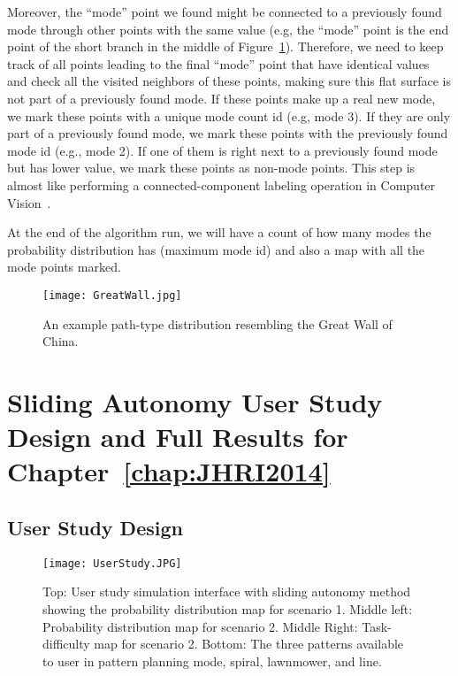 \begin{enumerate}
Moreover, the ``mode'' point we found might be connected to a previously found mode through other points with the same value (e.g, the ``mode'' point is the end point of the short branch in the middle of Figure~\ref{GreatWall}). Therefore, we need to keep track of all points leading to the final ``mode'' point that have identical values and check all the visited neighbors of these points, making sure this flat surface is not part of a previously found mode. If these points make up a real new mode, we mark these points with a unique mode count id (e.g, mode 3). If they are only part of a previously found mode, we mark these points with the previously found mode id (e.g., mode 2). If one of them is right next to a previously found mode but has lower value, we mark these points as non-mode points. This step is almost like performing a connected-component labeling operation in Computer Vision~\cite{Sonka2007Image}.
\end{enumerate}

At the end of the algorithm run, we will have a count of how many modes the probability distribution has (maximum mode id) and also a map with all the mode points marked.

\begin{figure}
\centering
\texttt{[image: GreatWall.jpg]}
\caption{An example path-type distribution resembling the Great Wall of China.}
\label{GreatWall}
\end{figure}




\chapter{Sliding Autonomy User Study Design and Full Results for Chapter~\ref{chap:JHRI2014}}
\label{chap:SlidingAutonomy}

\section{User Study Design} 
\label{sec:ADesign}

\begin{figure}
\centering
\texttt{[image: UserStudy.JPG]}
\caption{Top: User study simulation interface with sliding autonomy method showing the probability distribution map for scenario 1. Middle left: Probability distribution map for scenario 2. Middle Right: Task-difficulty map for scenario 2. Bottom: The three patterns available to user in pattern planning mode, spiral, lawnmower, and line.}
\label{UserStudy2}
\end{figure}

